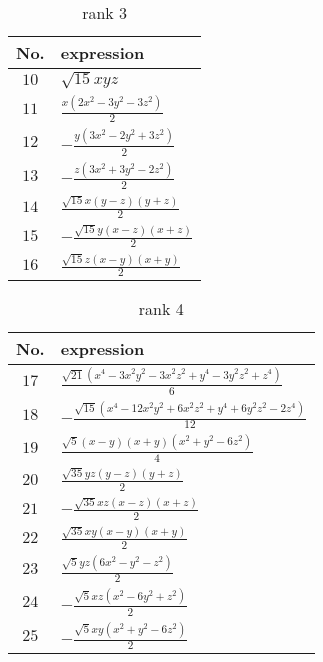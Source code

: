 \documentclass[fleqn,8pt,landscape]{jsarticle}
\begin{document}
\begin{table}[ht!]
\begin{center}
\caption{rank 3}
\renewcommand{\arraystretch}{1.3}
\begin{tabular}{cl} \hline \hline
No. & expression \\ \hline
$ 10 $ & $ \sqrt{15} x y z $ \\
$ 11 $ & $ \frac{x \left(2 x^{2} - 3 y^{2} - 3 z^{2}\right)}{2} $ \\
$ 12 $ & $ - \frac{y \left(3 x^{2} - 2 y^{2} + 3 z^{2}\right)}{2} $ \\
$ 13 $ & $ - \frac{z \left(3 x^{2} + 3 y^{2} - 2 z^{2}\right)}{2} $ \\
$ 14 $ & $ \frac{\sqrt{15} x \left(y - z\right) \left(y + z\right)}{2} $ \\
$ 15 $ & $ - \frac{\sqrt{15} y \left(x - z\right) \left(x + z\right)}{2} $ \\
$ 16 $ & $ \frac{\sqrt{15} z \left(x - y\right) \left(x + y\right)}{2} $ \\
 \hline \hline
\end{tabular}
\end{center}
\end{table}
\begin{table}[ht!]
\begin{center}
\caption{rank 4}
\renewcommand{\arraystretch}{1.3}
\begin{tabular}{cl} \hline \hline
No. & expression \\ \hline
$ 17 $ & $ \frac{\sqrt{21} \left(x^{4} - 3 x^{2} y^{2} - 3 x^{2} z^{2} + y^{4} - 3 y^{2} z^{2} + z^{4}\right)}{6} $ \\
$ 18 $ & $ - \frac{\sqrt{15} \left(x^{4} - 12 x^{2} y^{2} + 6 x^{2} z^{2} + y^{4} + 6 y^{2} z^{2} - 2 z^{4}\right)}{12} $ \\
$ 19 $ & $ \frac{\sqrt{5} \left(x - y\right) \left(x + y\right) \left(x^{2} + y^{2} - 6 z^{2}\right)}{4} $ \\
$ 20 $ & $ \frac{\sqrt{35} y z \left(y - z\right) \left(y + z\right)}{2} $ \\
$ 21 $ & $ - \frac{\sqrt{35} x z \left(x - z\right) \left(x + z\right)}{2} $ \\
$ 22 $ & $ \frac{\sqrt{35} x y \left(x - y\right) \left(x + y\right)}{2} $ \\
$ 23 $ & $ \frac{\sqrt{5} y z \left(6 x^{2} - y^{2} - z^{2}\right)}{2} $ \\
$ 24 $ & $ - \frac{\sqrt{5} x z \left(x^{2} - 6 y^{2} + z^{2}\right)}{2} $ \\
$ 25 $ & $ - \frac{\sqrt{5} x y \left(x^{2} + y^{2} - 6 z^{2}\right)}{2} $ \\
 \hline \hline
\end{tabular}
\end{center}
\end{table}
\end{document}
